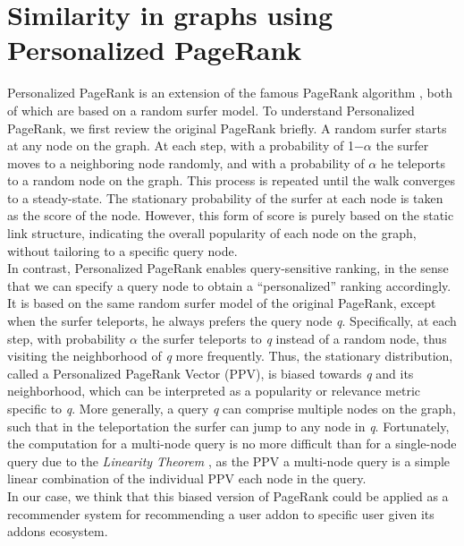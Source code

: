 \documentclass[11pt,oneside]{book}
\let\Oldsection\section
\renewcommand{\section}{\FloatBarrier\Oldsection}
\begin{document}
\section{Similarity in graphs using Personalized PageRank}

Personalized PageRank
is an extension of the famous PageRank algorithm \cite{page1999pagerank}, both of
which are based on a random surfer model. To understand Personalized PageRank, we first review the original
PageRank briefly. A random surfer starts at any node on the
graph. At each step, with a probability of 1−$\alpha$ the surfer moves to
a neighboring node randomly, and with a probability of $\alpha$ he teleports to a random node on the graph. This process
is repeated until the walk converges to a steady-state. The stationary
probability of the surfer at each node is taken as the score of
the node. However, this form of score is purely based on the static
link structure, indicating the overall popularity of each node on the
graph, without tailoring to a specific query node.\\
In contrast, Personalized PageRank enables query-sensitive ranking,
in the sense that we can specify a query node to obtain a “personalized”
ranking accordingly. It is based on the same random
surfer model of the original PageRank, except when the surfer teleports,
he always prefers the query node \textit{q}. Specifically, at each
step, with probability $\alpha$ the surfer teleports to \textit{q} instead of a random
node, thus visiting the neighborhood of \textit{q} more frequently.
Thus, the stationary distribution, called a Personalized PageRank
Vector (PPV), is biased towards \textit{q} and its neighborhood, which can
be interpreted as a popularity or relevance metric specific to \textit{q}.
More generally, a query \textit{q} can comprise multiple nodes on the
graph, such that in the teleportation the surfer can jump to any
node in \textit{q}. Fortunately, the computation for a multi-node query is
no more difficult than for a single-node query due to the \textit{Linearity Theorem} \citep{jeh2003scaling}, as the PPV a multi-node query is a simple
linear combination of the individual PPV each node in the
query.\\
In our case, we think that this biased version of PageRank could be applied as a recommender system for recommending a user addon to specific user given its addons ecosystem.

\end{document}
